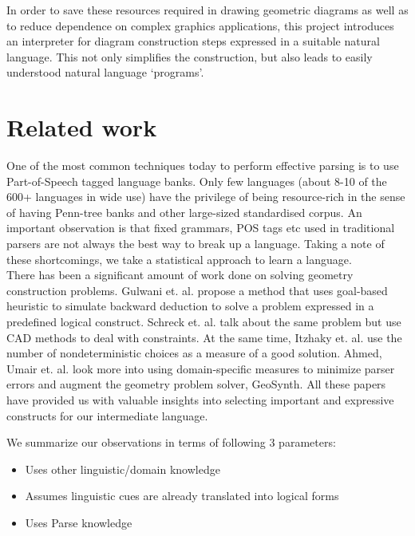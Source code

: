 \def\DevnagVersion{2.15}\documentclass[12pt]{article}
\begin{document}
In order to save these resources required in drawing geometric diagrams as well as to reduce dependence on complex graphics applications, this project introduces an interpreter for diagram construction steps expressed in a suitable natural language. This not only simplifies the construction, but also leads to easily understood natural language `programs'.\\

\section{Related work}
One of the most common techniques today to perform effective parsing is to use Part-of-Speech tagged language banks. Only few languages (about 8-10 of the 600+ languages in wide use) have the privilege of being resource-rich in the sense of having Penn-tree banks and other large-sized standardised corpus. An important observation is that fixed grammars, POS tags etc used in traditional parsers are not always the best way to break up a language. Taking a note of these shortcomings, we take a statistical approach to learn a language.\\

There has been a significant amount of work done on solving geometry construction problems. Gulwani et. al. \cite{gulwani2011synthesizing} propose a method that uses goal-based heuristic to simulate backward deduction to solve a problem expressed in a predefined logical construct. Schreck et. al. \cite{schreck2012geometric} talk about the same problem but use CAD methods to deal with constraints. At the same time, Itzhaky et. al. \cite{itzhaky2012solving} use the number of nondeterministic choices as a measure of a good solution. Ahmed, Umair et. al. \cite{ahmed2012can} look more into using domain-specific measures to minimize parser errors and augment the geometry problem solver, GeoSynth. All these papers have provided us with valuable insights into selecting important and expressive constructs for our intermediate language.



We summarize our observations in terms of following 3 parameters:
\begin{itemize}
\item Uses other linguistic/domain knowledge
\item Assumes linguistic cues are already translated into logical forms
\item Uses Parse knowledge
\end{itemize}
\end{document}
